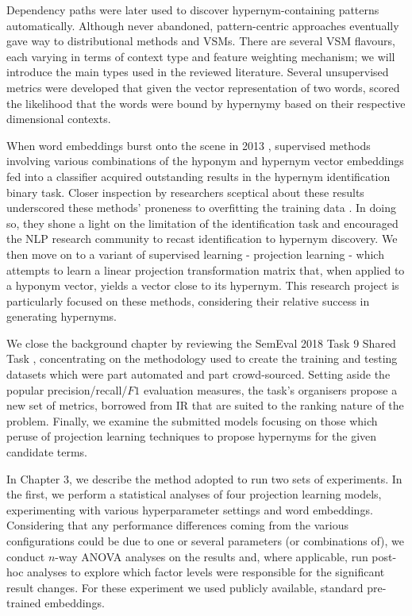 Dependency paths were later used to discover hypernym-containing patterns automatically.  Although never abandoned, pattern-centric approaches eventually gave way to distributional methods and \acl{VSM}s.  There are several \ac{VSM} flavours, each varying in terms of context type and feature weighting mechanism; we will introduce the main types used in the reviewed literature.  Several unsupervised metrics were developed that given the vector representation of two words, scored the likelihood that the words were bound by hypernymy based on their respective dimensional contexts.

When word embeddings burst onto the scene in 2013 \citep{mikolov2013distributed}, supervised methods involving various combinations of the hyponym and hypernym vector embeddings fed into a classifier acquired outstanding results in the hypernym identification binary task.  Closer inspection by researchers sceptical about these results underscored these methods’ proneness to overfitting the training data \citep{levy2015supervised, santus2016nine}. In doing so, they shone a light on the limitation of the identification task and encouraged the NLP research community to recast identification to hypernym discovery.  We then move on to a variant of supervised learning - projection learning - which attempts to learn a linear projection transformation matrix that, when applied to a hyponym vector, yields a vector close to its hypernym.  This research project is particularly focused on these methods, considering their relative success in generating hypernyms.  

We close the background chapter by reviewing the SemEval 2018 Task 9 Shared Task \citep{camacho2018semeval}, concentrating on the methodology used to create the training and testing datasets which were part automated and part crowd-sourced.  Setting aside the popular precision/recall/\(F1\) evaluation measures, the task’s organisers propose a new set of metrics, borrowed from \ac{IR} that are suited to the ranking nature of the problem.  Finally, we examine the submitted models focusing on those which peruse of projection learning techniques to propose hypernyms for the given candidate terms.

In Chapter 3, we describe the method adopted to run two sets of experiments.  In the first, we perform a statistical analyses of four projection learning models, experimenting with various hyperparameter settings and word embeddings.  Considering that any performance differences coming from the various configurations could be due to one or several parameters (or combinations of), we conduct $n$-way \ac{ANOVA} analyses on the results and, where applicable, run post-hoc analyses to explore which factor levels were responsible for the significant result changes.  For these experiment we used publicly available, standard pre-trained embeddings.

